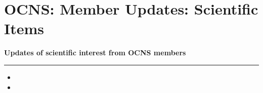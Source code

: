 \section*{OCNS: Member Updates: Scientific Items}%
\textbf{\large Updates of scientific interest from OCNS members\\}
\rule{\textwidth}{0.4pt}

\begin{itemize}
    \item {}
    \item {}
\end{itemize}

